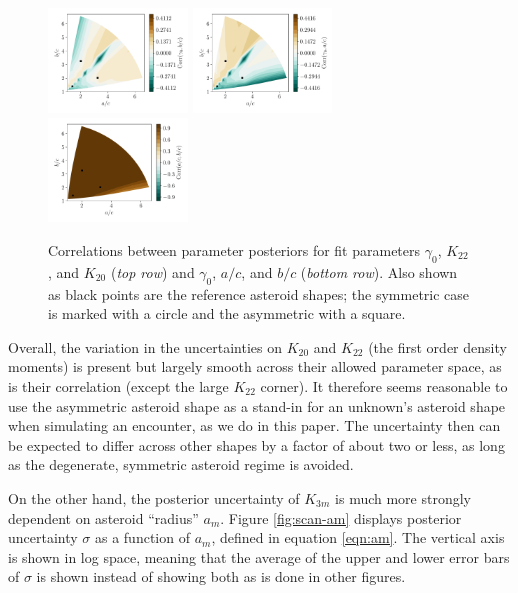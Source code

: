 \documentclass[fleqn,usenatbib]{mnras}
\begin{document}
\begin{figure}
  \includegraphics[width=0.33\textwidth]{figs/probe-space-ab-1b.pdf}\hfill
  \includegraphics[width=0.33\textwidth]{figs/probe-space-ab-1a.pdf}\hfill
  \includegraphics[width=0.33\textwidth]{figs/probe-space-ab-ab.pdf}
  
  \caption{Correlations between parameter posteriors for fit parameters $\gamma_0$, $K_{22}$, and $K_{20}$ (\textit{top row}) and $\gamma_0$, $a/c$, and $b/c$ (\textit{bottom row}).  Also shown as black points are the reference asteroid shapes; the symmetric case is marked with a circle and the asymmetric with a square.}
  \label{fig:scan-space-corr}
\end{figure}

Overall, the variation in the uncertainties on $K_{20}$ and $K_{22}$ (the first order density moments) is present but largely smooth across their allowed parameter space, as is their correlation (except the large $K_{22}$ corner). It therefore seems reasonable to use the asymmetric asteroid shape as a stand-in for an unknown's asteroid shape when simulating an encounter, as we do in this paper. The uncertainty then can be expected to differ across other shapes by a factor of about two or less, as long as the degenerate, symmetric asteroid regime is avoided.

On the other hand, the posterior uncertainty of $K_{3m}$ is much more strongly dependent on asteroid ``radius'' $a_m$. Figure \ref{fig:scan-am} displays posterior uncertainty $\sigma$ as a function of $a_m$, defined in equation \ref{eqn:am}. The vertical axis is shown in log space, meaning that the average of the upper and lower error bars of $\sigma$ is shown instead of showing both as is done in other figures.
\end{document}
